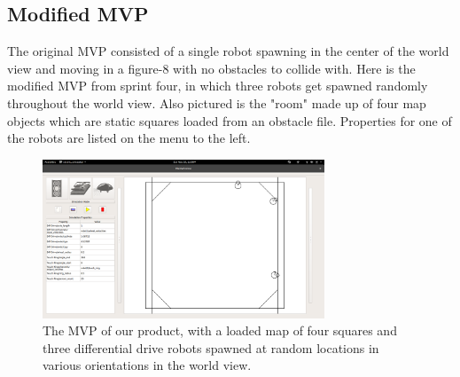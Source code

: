 \subsection{Modified MVP}

The original MVP consisted of a single robot spawning in the center of the world view and moving in a figure-8 with no obstacles to collide with. Here is the modified MVP from sprint four, in which three robots get spawned randomly throughout the world view. Also pictured is the "room" made up of four map objects which are static squares loaded from an obstacle file. Properties for one of the robots are listed on the menu to the left.

\begin{figure}[!htb]
\begin{center}
\includegraphics[width=0.75\textwidth]{./Images/Sprint3_hasBox_originalUI}
\end{center}
\caption{The MVP of our product, with a loaded map of four squares and three differential drive robots spawned at random locations in various orientations in the world view. \label{mvp}}
\end{figure}